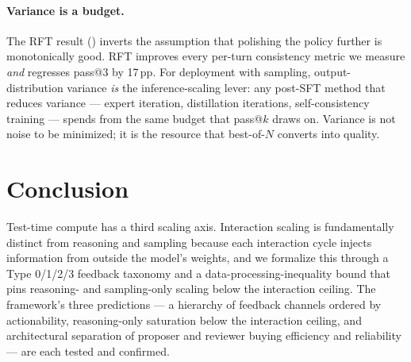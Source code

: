 \paragraph{Variance is a budget.} The RFT result () inverts the assumption that polishing the policy further is monotonically good. RFT improves every per-turn consistency metric we measure \emph{and} regresses pass@3 by 17\,pp. For deployment with sampling, output-distribution variance \emph{is} the inference-scaling lever: any post-SFT method that reduces variance --- expert iteration, distillation iterations, self-consistency training --- spends from the same budget that pass@$k$ draws on. Variance is not noise to be minimized; it is the resource that best-of-$N$ converts into quality.

\section{Conclusion}
\label{sec:conclusion}

Test-time compute has a third scaling axis. Interaction scaling is fundamentally distinct from reasoning and sampling because each interaction cycle injects information from outside the model's weights, and we formalize this through a Type 0/1/2/3 feedback taxonomy and a data-processing-inequality bound that pins reasoning- and sampling-only scaling below the interaction ceiling. The framework's three predictions --- a hierarchy of feedback channels ordered by actionability, reasoning-only saturation below the interaction ceiling, and architectural separation of proposer and reviewer buying efficiency and reliability --- are each tested and confirmed.

